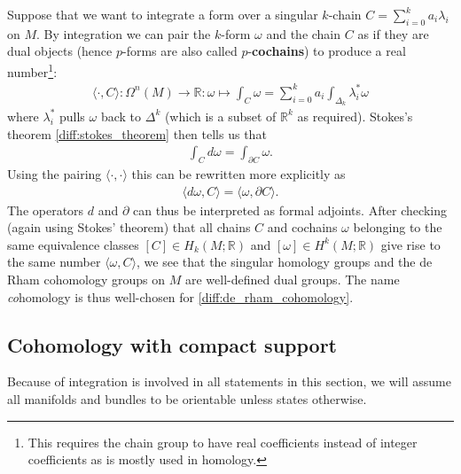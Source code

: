     Suppose that we want to integrate a form over a singular $k$-chain $C = \sum_{i=0}^ka_i\lambda_i$ on $M$. By integration we can pair the $k$-form $\omega$ and the chain $C$ as if they are dual objects (hence $p$-forms are also called $p$-\textbf{cochains}) to produce a real number\footnote{This requires the chain group to have real coefficients instead of integer coefficients as is mostly used in homology.}:
    \begin{gather}
        \langle\cdot,C\rangle:\Omega^n(M)\rightarrow\mathbb{R}:\omega\mapsto\int_C\omega = \sum_{i=0}^ka_i\int_{\Delta_k}\lambda_i^{*}\omega
    \end{gather}
    where $\lambda_i^*$ pulls $\omega$ back to $\Delta^k$ (which is a subset of $\mathbb{R}^k$ as required). Stokes's theorem \ref{diff:stokes_theorem} then tells us that
    \begin{gather}
        \int_Cd\omega = \int_{\partial C}\omega.
    \end{gather}
    Using the pairing $\langle\cdot,\cdot\rangle$ this can be rewritten more explicitly as
    \begin{gather}
        \langle d\omega, C\rangle = \langle \omega, \partial C\rangle.
    \end{gather}
    The operators $d$ and $\partial$ can thus be interpreted as formal adjoints. After checking (again using Stokes' theorem) that all chains $C$ and cochains $\omega$ belonging to the same equivalence classes $[C]\in H_k(M; \mathbb{R})$ and $[\omega]\in H^k(M; \mathbb{R})$ give rise to the same number $\langle\omega, C\rangle$, we see that the singular homology groups and the de Rham cohomology groups on $M$ are well-defined dual groups. The name \textit{co}homology is thus well-chosen for \ref{diff:de_rham_cohomology}.

\subsection{Cohomology with compact support}

    Because of integration is involved in all statements in this section, we will assume all manifolds and bundles to be orientable unless states otherwise.

